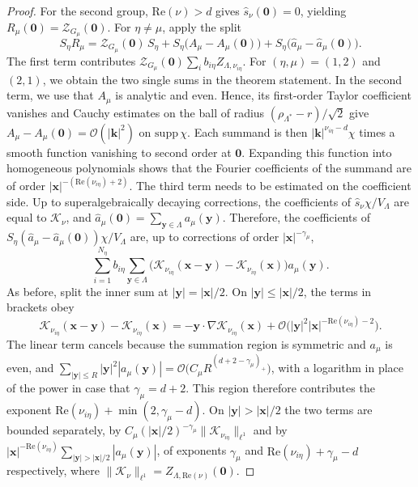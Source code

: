 \documentclass[10pt,a4paper]{amsart}
\begin{document}
\begin{proof}
For the second group, $\mathrm{Re}(\nu)>d$ gives $\hat s_\nu(\bm 0)=0$, yielding
$R_\mu(\bm 0)=\mathcal Z_{G_\mu}(\bm 0)$. For $\eta\neq\mu$, apply the split
\[
S_\eta R_\mu=\mathcal Z_{G_\mu}(\bm 0)\,S_\eta
+S_\eta\big(A_\mu-A_\mu(\bm 0)\big)
+S_\eta\big(\hat a_\mu-\hat a_\mu(\bm 0)\big).
\]
The first term contributes
$\mathcal Z_{G_\mu}(\bm 0)\sum_i b_{i\eta}Z_{\Lambda,\nu_{i\eta}}$. For $(\eta,\mu)=(1,2)$ and $(2,1)$, we obtain the two single sums in the theorem statement. In the second term, we use that $A_\mu$ is analytic and even. Hence, its
first-order Taylor coefficient vanishes and Cauchy estimates on the ball of radius
$(\rho_{\Lambda^\ast}-r)/\sqrt2$ give $A_\mu-A_\mu(\bm 0)=\mathcal O(|\bm k|^{2})$ on $\mathrm{supp}\,\chi$. Each summand is then $|\bm k|^{\nu_{i\eta}-d}\chi$ times a smooth function vanishing to second order at $\bm 0$. Expanding this function into homogeneous polynomials shows that the Fourier coefficients of the summand are of order $|\bm x|^{-(\mathrm{Re}(\nu_{i\eta})+2)}$.  The third term needs to be estimated on the coefficient side. Up to superalgebraically decaying corrections, the coefficients of $\hat s_\nu\chi/V_\Lambda$ are equal to $\mathcal K_\nu$, and $\hat a_\mu(\bm 0)=\sum_{\bm y\in \Lambda}a_\mu(\bm y)$. Therefore, the coefficients of $S_\eta(\hat a_\mu-\hat a_\mu(\bm 0))\chi/V_\Lambda$ are, up to corrections of order $|\bm x|^{-\gamma_\mu}$,
\[
\sum_{i=1}^{N_\eta} b_{i\eta}\sum_{\bm y\in\Lambda}
\Big(\mathcal K_{\nu_{i\eta}}(\bm x-\bm y)-\mathcal K_{\nu_{i\eta}}(\bm x)\Big)
a_\mu(\bm y).
\]
As before, split the inner sum at $|\bm y|=|\bm x|/2$. On $|\bm y|\le|\bm x|/2$, the terms in brackets obey
\[\mathcal K_{\nu_{i\eta}}(\bm x-\bm y)-\mathcal K_{\nu_{i\eta}}(\bm x)=-\bm y\cdot\nabla\mathcal K_{\nu_{i\eta}}(\bm x)
+\mathcal O\big(|\bm y|^{2}|\bm x|^{-\mathrm{Re}(\nu_{i\eta})-2}\big).\] The linear term cancels because the summation region is symmetric and $a_\mu$ is even, and $\sum_{|\bm y|\le R}|\bm y|^{2}|a_\mu(\bm y)| =\mathcal O\big(C_\mu R^{(d+2-\gamma_\mu)_+}\big)$, with a logarithm in place of the power in case that $\gamma_\mu=d+2$. 
This region therefore contributes the exponent $\mathrm{Re}(\nu_{i\eta})+\min(2,\gamma_\mu-d)$. On $|\bm y|>|\bm x|/2$ the two terms are bounded separately, by $C_\mu(|\bm x|/2)^{-\gamma_\mu}\|\mathcal K_{\nu_{i\eta}}\|_{\ell^1}$ and by $|\bm x|^{-\mathrm{Re}(\nu_{i\eta})}\sum_{|\bm y|>|\bm x|/2}|a_\mu(\bm y)|$, of exponents $\gamma_\mu$ and $\mathrm{Re}(\nu_{i\eta})+\gamma_\mu-d$ respectively, where $\|\mathcal K_\nu\|_{\ell^1}=Z_{\Lambda,\mathrm{Re}(\nu)}(\bm 0)$.


\end{proof}
\end{document}
